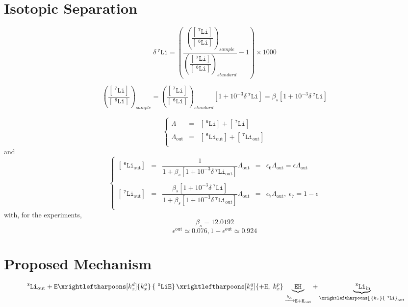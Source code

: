 \documentclass[aps,onecolumn,10pt]{revtex4}
\newcommand{\mychem}[1]{\mathtt{#1}}
\newcommand{\myconc}[1]{\left\lbrack{#1}\right\rbrack}
\newcommand{\spLi}[1]{{~^{\mychem{#1}}\mychem{Li}}}
\newcommand{\Li}[1]{\myconc{\spLi{#1}}}
\newcommand{\spEout}{\mychem{E}}
\newcommand{\spLiE}[1]{\left\lbrace\spLi{#1}\spEout\right\rbrace}
\newcommand{\spLiIn}[1]{{\spLi{#1}}_{\mathrm{in}}}
\newcommand{\spLiOut}[1]{{\spLi{#1}}_{\mathrm{out}}}
\newcommand{\LiOut}[1]{\myconc{\spLiOut{#1}}}
\newcommand{\spEHin}{\mychem{EH}}
\newcommand{\deltaLi}{ {\delta\!\!\!\spLi{7}} }
\newcommand{\deltaLiOut}{{\deltaLi}_{\mathrm{out}}}
\newcommand{\LiAll}{\Lambda}
\newcommand{\LiAllOut}{{\LiAll}_{\mathrm{out}}}
\begin{document}

\section{Isotopic Separation}
$$
	\deltaLi = \left(
		\dfrac{\left(\dfrac{\Li{7}}{\Li{6}}\right)_{sample}}
		{\left(\dfrac{\Li{7}}{\Li{6}}\right)_{standard}}
		 -1 
	\right) \times 1000
$$

$$
	\left(\dfrac{\Li{7}}{\Li{6}}\right)_{sample} = \left(\dfrac{\Li{7}}{\Li{6}}\right)_{standard} \left[1+10^{-3}\deltaLi\right] = \beta_s \left[1+10^{-3}\deltaLi\right]
$$

\begin{equation}
\left\lbrace
\begin{array}{rcl}
	\LiAll    & = & \Li{6} + \Li{7}\\
	\LiAllOut & = & \LiOut{6} + \LiOut{7}\\
\end{array}
\right.
\end{equation}
and
\begin{equation}
\left\lbrace
\begin{array}{rclcl}
	\LiOut{6} & = & \dfrac{1}{1+\beta_s \left[1+10^{-3}\deltaLiOut\right] } \LiAllOut & = & \epsilon_6 \LiAllOut  = \epsilon \LiAllOut \\
	\\
	\LiOut{7} & = & \dfrac{\beta_s \left[1+10^{-3}\deltaLi\right]}{1+\beta_s \left[1+10^{-3}\deltaLiOut\right] } \LiAllOut & = & \epsilon_7 \LiAllOut,\;\epsilon_7 = 1-\epsilon \\
\end{array}
\right.
\end{equation}
with, for the experiments,
\begin{equation}
	\beta_s = 12.0192
\end{equation}
\begin{equation}
	\epsilon^\mathrm{out} \simeq 0.076, 1-\epsilon^\mathrm{out} \simeq 0.924
\end{equation}

\section{Proposed Mechanism}

\begin{equation}
	 \spLiOut{x} +  \spEout  
	 \xrightleftharpoons[k_x^d]{k_x^a} 
	 \spLiE{x}
	  \xrightleftharpoons[k_x^q]{\mychem{+H},\;k_x^p} 
	  \underbrace{\spEHin}_{\xrightarrow[]{k_h} \mychem{E} + \mychem{H}_{\mathrm{out}}} + \underbrace{\spLiIn{x}}_{\xrightleftharpoons[]{k_x} \spLiOut{x}}
\end{equation}
\end{document}
